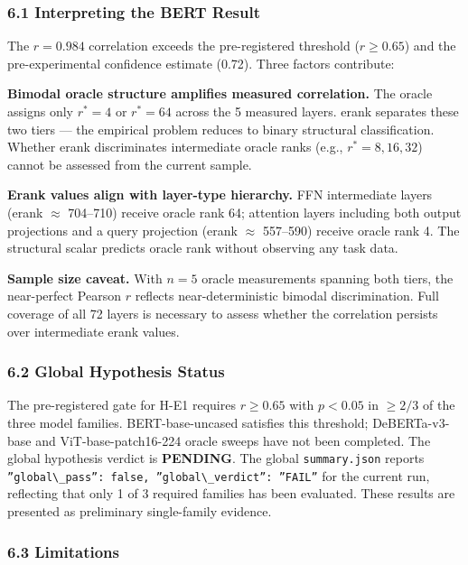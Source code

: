 
\subsubsection{6.1 Interpreting the BERT Result}

The $r = 0.984$ correlation exceeds the pre-registered threshold ($r \geq 0.65$) and the pre-experimental confidence estimate (0.72). Three factors contribute:

\textbf{Bimodal oracle structure amplifies measured correlation.} The oracle assigns only $r^* = 4$ or $r^* = 64$ across the 5 measured layers. erank separates these two tiers --- the empirical problem reduces to binary structural classification. Whether erank discriminates intermediate oracle ranks (e.g., $r^* = 8, 16, 32$) cannot be assessed from the current sample.

\textbf{Erank values align with layer-type hierarchy.} FFN intermediate layers (erank $\approx$ 704--710) receive oracle rank 64; attention layers including both output projections and a query projection (erank $\approx$ 557--590) receive oracle rank 4. The structural scalar predicts oracle rank without observing any task data.

\textbf{Sample size caveat.} With $n = 5$ oracle measurements spanning both tiers, the near-perfect Pearson $r$ reflects near-deterministic bimodal discrimination. Full coverage of all 72 layers is necessary to assess whether the correlation persists over intermediate erank values.

\subsubsection{6.2 Global Hypothesis Status}

The pre-registered gate for H-E1 requires $r \geq 0.65$ with $p < 0.05$ in $\geq 2/3$ of the three model families. BERT-base-uncased satisfies this threshold; DeBERTa-v3-base and ViT-base-patch16-224 oracle sweeps have not been completed. The global hypothesis verdict is \textbf{PENDING}. The global \texttt{summary.json} reports \texttt{''global\textbackslash \_pass'': false, ''global\textbackslash \_verdict'': ''FAIL''} for the current run, reflecting that only 1 of 3 required families has been evaluated. These results are presented as preliminary single-family evidence.

\subsubsection{6.3 Limitations}

